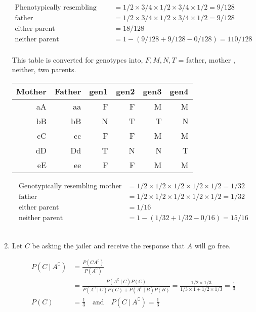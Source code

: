 \begin{enumerate}
	
		\begin{align}
			\text{Phenotypically resembling mother} &=  1/2 \times 3/4 \times 1/2 \times 3/4 \times 1/2  = 9/128\\
			\text{father} &=  1/2 \times 3/4 \times 1/2 \times 3/4 \times 1/2  = 9/128\\
			\text{either parent} &=  18/128 \\
			\text{neither parent} &=  1 - (9 / 128 + 9 / 128 - 0/128) = 110/128
		\end{align}
	\\
	This table is converted for genotypes into, $ F, M, N, T $ = father, mother , neither, two parents.\\
	
	\begin{table}[H]
		\centering
		\begin{tabular}{@{}rr|rrrr@{}}
			\toprule
			Mother & Father & gen1 & gen2 & gen3 & gen4 \\ \midrule
			aA     & aa		& F	 & F 	  & M 	   & M   \\
			bB     & bB     & N	 & T 	  & T 	   & N    \\
			cC     & cc     & F	 & F 	  & M 	   & M    \\
			dD     & Dd     & T	 & N 	  & N 	   & T    \\
			eE     & ee     & F	 & F 	  & M 	   & M    \\ \bottomrule
		\end{tabular}
	\end{table}
	
	
		\begin{align}
			\text{Genotypically resembling mother} &=  1/2 \times 1/2 \times 1/2 \times 1/2 \times 1/2  = 1/32\\
			\text{father} &=   1/2 \times 1/2 \times 1/2 \times 1/2 \times 1/2  = 1/32\\
			\text{either parent} &=  1/16 \\
			\text{neither parent} &=  1 - (1/32 + 1/32 - 0/16) = 15/16
		\end{align}
	\\
	
	\item Let $ C $ be asking the jailer and receive the response that $ A $ will go free. 
	
		\begin{align}
			P(C\ |\ A^\complement) &= \frac{P(C A^\complement)}{P(A^\complement)} \\
			& = \frac{P(A^\complement\ |\ C) P(C)}{P(A^\complement\ |\ C) P(C) +P(A^\complement\ |\ B) P(B)}  = \frac{1/2 \times 1/3}{1/3 \times 1 + 1/2 \times 1/3} = \frac{1}{3}\\
			P(C) &= \frac{1}{3} \quad \text{and} \quad P(C\ |\ A^\complement) = \frac{1}{3}
		\end{align}\\
	

\end{enumerate}
